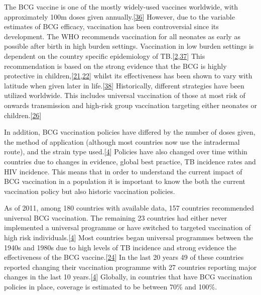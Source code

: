 \documentclass[11pt,twoside]{bristolthesis}
\begin{document}
  The BCG vaccine is one of the mostly widely-used vaccines worldwide, with approximately 100m doses given annually.{[}\protect\hyperlink{ref-The2004}{36}{]} However, due to the variable estimates of BCG efficacy, vaccination has been controversial since its development. The WHO recommends vaccination for all neonates as early as possible after birth in high burden settings. Vaccination in low burden settings is dependent on the country specific epidemiology of TB.{[}\protect\hyperlink{ref-TheWorldHealthOrganization:2018va}{2},\protect\hyperlink{ref-WHO2017}{37}{]} This recommendation is based on the strong evidence that the BCG is highly protective in children,{[}\protect\hyperlink{ref-Rodrigues1993}{21},\protect\hyperlink{ref-Colditz1994}{22}{]} whilst its effectiveness has been shown to vary with latitude when given later in life.{[}\protect\hyperlink{ref-Mangtani2014}{38}{]} Historically, different strategies have been utilized worldwide. This includes universal vaccination of those at most risk of onwards transmission and high-risk group vaccination targeting either neonates or children.{[}\protect\hyperlink{ref-Abubakar2013}{26}{]}
  
  In addition, BCG vaccination policies have differed by the number of doses given, the method of application (although most countries now use the intradermal route), and the strain type used.{[}\protect\hyperlink{ref-Zwerling2011a}{4}{]} Policies have also changed over time within countries due to changes in evidence, global best practice, TB incidence rates and HIV incidence. This means that in order to understand the current impact of BCG vaccination in a population it is important to know the both the current vaccination policy but also historic vaccination policies.
  
  As of 2011, among 180 countries with available data, 157 countries recommended universal BCG vaccination. The remaining 23 countries had either never implemented a universal programme or have switched to targeted vaccination of high risk individuals.{[}\protect\hyperlink{ref-Zwerling2011a}{4}{]} Most countries began universal programmes between the 1940s and 1980s due to high levels of TB incidence and strong evidence the effectiveness of the BCG vaccine.{[}\protect\hyperlink{ref-Hart1972}{24}{]} In the last 20 years 49 of these countries reported changing their vaccination programme with 27 countries reporting major changes in the last 10 years.{[}\protect\hyperlink{ref-Zwerling2011a}{4}{]} Globally, in countries that have BCG vaccination policies in place, coverage is estimated to be between 70\% and 100\%.
  
\end{document}
